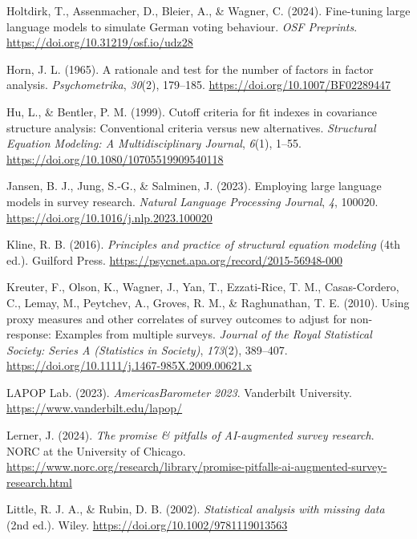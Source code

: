 \documentclass[
  man,
  floatsintext,
  longtable,
  nolmodern,
  notxfonts,
  notimes,
  colorlinks=true,linkcolor=blue,citecolor=blue,urlcolor=blue]{apa7}
\newlength{\cslhangindent}
\newenvironment{CSLReferences}[2] %
 {\begin{list}{}{%
  \setlength{\itemindent}{0pt}
  \setlength{\leftmargin}{0pt}
  \setlength{\parsep}{0pt}
  \ifodd #1
   \setlength{\leftmargin}{\cslhangindent}
   \setlength{\itemindent}{-1\cslhangindent}
  \fi
  \setlength{\itemsep}{#2\baselineskip}}}
 {\end{list}}
\begin{document}
\begin{CSLReferences}{1}{0}
Holtdirk, T., Assenmacher, D., Bleier, A., \& Wagner, C. (2024).
Fine-tuning large language models to simulate {German} voting behaviour.
\emph{OSF Preprints}. \url{https://doi.org/10.31219/osf.io/udz28}

Horn, J. L. (1965). A rationale and test for the number of factors in
factor analysis. \emph{Psychometrika}, \emph{30}(2), 179--185.
\url{https://doi.org/10.1007/BF02289447}

Hu, L., \& Bentler, P. M. (1999). Cutoff criteria for fit indexes in
covariance structure analysis: Conventional criteria versus new
alternatives. \emph{Structural Equation Modeling: A Multidisciplinary
Journal}, \emph{6}(1), 1--55.
\url{https://doi.org/10.1080/10705519909540118}

Jansen, B. J., Jung, S.-G., \& Salminen, J. (2023). Employing large
language models in survey research. \emph{Natural Language Processing
Journal}, \emph{4}, 100020.
\url{https://doi.org/10.1016/j.nlp.2023.100020}

Kline, R. B. (2016). \emph{Principles and practice of structural
equation modeling} (4th ed.). Guilford Press.
\url{https://psycnet.apa.org/record/2015-56948-000}

Kreuter, F., Olson, K., Wagner, J., Yan, T., Ezzati-Rice, T. M.,
Casas-Cordero, C., Lemay, M., Peytchev, A., Groves, R. M., \&
Raghunathan, T. E. (2010). Using proxy measures and other correlates of
survey outcomes to adjust for non-response: Examples from multiple
surveys. \emph{Journal of the Royal Statistical Society: Series A
(Statistics in Society)}, \emph{173}(2), 389--407.
\url{https://doi.org/10.1111/j.1467-985X.2009.00621.x}

LAPOP Lab. (2023). \emph{{AmericasBarometer} 2023}. Vanderbilt
University. \url{https://www.vanderbilt.edu/lapop/}

Lerner, J. (2024). \emph{The promise \& pitfalls of {AI}-augmented
survey research}. NORC at the University of Chicago.
\url{https://www.norc.org/research/library/promise-pitfalls-ai-augmented-survey-research.html}

Little, R. J. A., \& Rubin, D. B. (2002). \emph{Statistical analysis
with missing data} (2nd ed.). Wiley.
\url{https://doi.org/10.1002/9781119013563}


\end{CSLReferences}
\end{document}
